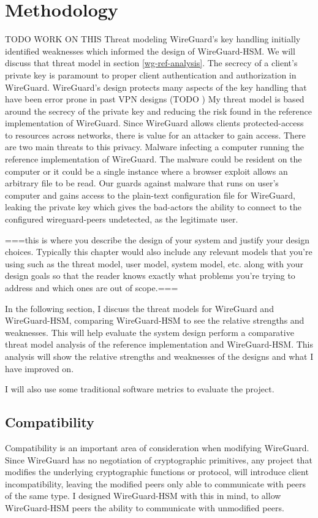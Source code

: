 \documentclass [11pt, proquest] {uwthesis}[2020/02/24]
\begin{document}
\chapter {Methodology}
TODO WORK ON THIS
Threat modeling WireGuard's key handling initially identified weaknesses  which informed the design of WireGuard-HSM. We will discuss that threat model in section \ref{wg-ref-analysis}.
The secrecy of a client's private key is paramount to proper client authentication and authorization in WireGuard. WireGuard's design protects many aspects of the key handling that have been error prone in past VPN designs (TODO )
My threat model is based around the secrecy of the private key and reducing the risk found in the reference implementation of WireGuard. Since WireGuard allows clients protected-access to resources across networks, there is value for an attacker to gain access. 
There are two main threats to this privacy. Malware infecting a computer running the reference implementation of WireGuard. The malware could be resident on the computer or it could be a single instance where a browser exploit allows an arbitrary file to be read. Our guards against malware that runs on user's computer and gains access to the plain-text configuration file for WireGuard, leaking the private key which gives the bad-actors the ability to connect to the configured wireguard-peers undetected, as the legitimate user.


===this is where you describe the design of your system and justify your design choices.  Typically this chapter would also include any relevant models that you're using such as the threat model, user model, system model, etc. along with your design goals so that the reader knows exactly what problems you're trying to address and which ones are out of scope.===

In the following section, I discuss the threat models for WireGuard and WireGuard-HSM, comparing WireGuard-HSM to see the relative strengths and weaknesses. This will help evaluate the system design perform a comparative threat model analysis of the reference implementation and WireGuard-HSM. This analysis will show the relative strengths and weaknesses of the designs and what I have improved on.

I will also use some traditional software metrics to evaluate the project.


\section{Compatibility}
Compatibility is an important area of consideration when modifying WireGuard. Since WireGuard has no negotiation of cryptographic primitives, any project that modifies the underlying cryptographic functions or protocol, will introduce client incompatibility, leaving the modified peers only able to communicate with peers of the same type. I designed WireGuard-HSM with this in mind, to allow WireGuard-HSM peers the ability to communicate with unmodified peers.
\end{document}
